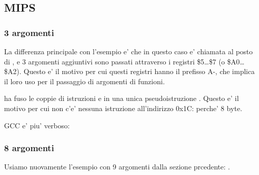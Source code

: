 \subsection{MIPS}

\subsubsection{3 argomenti}


La differenza principale con l'esempio \q{\HelloWorldSectionName} e' che in questo caso \printf e' chiamata 
al posto di \puts, e 3 argomenti aggiuntivi sono passati attraverso i registri \$5\dots \$7 (o \$A0\dots \$A2).
Questo e' il motivo per cui questi registri hanno il prefisso A-, che implica il loro uso per il passaggio di argomenti di funzioni.





\IDA ha fuso le coppie di istruzioni  e  in una unica pseudoistruzione .
Questo e' il motivo per cui non c'e' nessuna istruzione all'indirizzo 0x1C: perche'   8 byte.%


\NonOptimizing GCC e' piu' verboso:





\subsubsection{8 argomenti}

Usiamo nuovamente l'esempio con 9 argomenti dalla sezione prcedente: .




